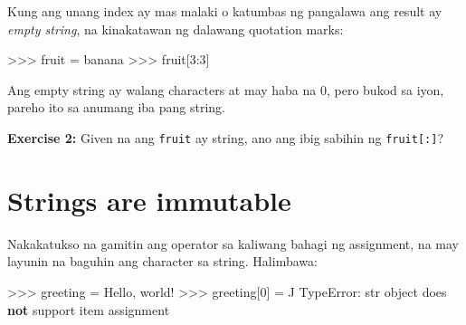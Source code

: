 \documentclass[10pt,]{book}
\newenvironment{Shaded}{}{}
\newcommand{\BuiltInTok}[1]{\textcolor[rgb]{0.00,0.50,0.00}{#1}}
\newcommand{\CommentTok}[1]{\textcolor[rgb]{0.38,0.63,0.69}{\textit{#1}}}
\newcommand{\DecValTok}[1]{\textcolor[rgb]{0.25,0.63,0.44}{#1}}
\newcommand{\KeywordTok}[1]{\textcolor[rgb]{0.00,0.44,0.13}{\textbf{#1}}}
\newcommand{\NormalTok}[1]{#1}
\newcommand{\OperatorTok}[1]{\textcolor[rgb]{0.40,0.40,0.40}{#1}}
\newcommand{\PreprocessorTok}[1]{\textcolor[rgb]{0.74,0.48,0.00}{#1}}
\newcommand{\StringTok}[1]{\textcolor[rgb]{0.25,0.44,0.63}{#1}}
\begin{document}
Kung ang unang index ay mas malaki o katumbas ng pangalawa ang result ay
\emph{empty string}, na kinakatawan ng dalawang quotation marks:


\begin{Shaded}
\begin{Highlighting}[]
\OperatorTok{\textgreater{}\textgreater{}\textgreater{}}\NormalTok{ fruit }\OperatorTok{=} \StringTok{\textquotesingle{}banana\textquotesingle{}}
\OperatorTok{\textgreater{}\textgreater{}\textgreater{}}\NormalTok{ fruit[}\DecValTok{3}\NormalTok{:}\DecValTok{3}\NormalTok{]}
\CommentTok{\textquotesingle{}\textquotesingle{}}
\end{Highlighting}
\end{Shaded}

Ang empty string ay walang characters at may haba na 0, pero bukod sa
iyon, pareho ito sa anumang iba pang string.

\textbf{Exercise 2:} Given na ang \texttt{fruit} ay string, ano ang ibig
sabihin ng \texttt{fruit{[}:{]}}?

 

\section{Strings are immutable}\label{strings-are-immutable}

  

Nakakatukso na gamitin ang operator sa kaliwang bahagi ng assignment, na
may layunin na baguhin ang character sa string. Halimbawa:

 

\begin{Shaded}
\begin{Highlighting}[]
\OperatorTok{\textgreater{}\textgreater{}\textgreater{}}\NormalTok{ greeting }\OperatorTok{=} \StringTok{\textquotesingle{}Hello, world!\textquotesingle{}}
\OperatorTok{\textgreater{}\textgreater{}\textgreater{}}\NormalTok{ greeting[}\DecValTok{0}\NormalTok{] }\OperatorTok{=} \StringTok{\textquotesingle{}J\textquotesingle{}}
\PreprocessorTok{TypeError}\NormalTok{: }\StringTok{\textquotesingle{}str\textquotesingle{}} \BuiltInTok{object}\NormalTok{ does }\KeywordTok{not}\NormalTok{ support item assignment}
\end{Highlighting}
\end{Shaded}
\end{document}
